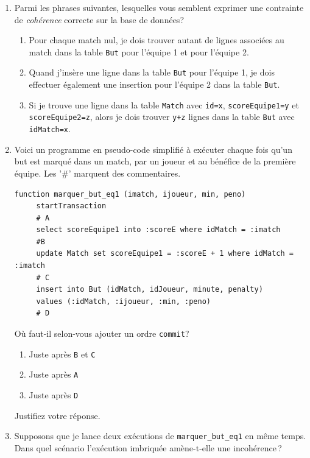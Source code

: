 \begin{enumerate}

\item   Parmi les phrases suivantes, lesquelles vous semblent exprimer une contrainte de \emph{cohérence} correcte sur la base de données?

\begin{enumerate}
  \item Pour chaque match nul, je dois trouver autant de lignes associées au match dans la table \texttt{But} pour l'équipe 1 et pour l'équipe 2.
  \item Quand j'insère une ligne dans la table \texttt{But} pour l'équipe 1, je dois effectuer également une insertion pour l'équipe 2 dans la table \texttt{But}.
  \item Si je trouve une ligne dans la table \texttt{Match} avec \texttt{id=x}, \texttt{scoreEquipe1=y} et \texttt{scoreEquipe2=z}, alors je dois trouver \texttt{y+z} lignes dans la table \texttt{But} avec \texttt{idMatch=x}.
 \end{enumerate}
 
 \item Voici un programme en pseudo-code simplifié à exécuter chaque fois qu'un but est marqué dans un match, par un joueur et au bénéfice de la première équipe. Les '\#' marquent des commentaires.
        
\begin{verbatim}
function marquer_but_eq1 (imatch, ijoueur, min, peno)
     startTransaction
     # A
     select scoreEquipe1 into :scoreE where idMatch = :imatch
     #B
     update Match set scoreEquipe1 = :scoreE + 1 where idMatch = :imatch
     # C
     insert into But (idMatch, idJoueur, minute, penalty)
     values (:idMatch, :ijoueur, :min, :peno)
     # D
\end{verbatim}
 
 Où faut-il selon-vous ajouter un ordre \texttt{commit}?
 \begin{enumerate}
   \item Juste après \texttt{B} et \texttt{C}
   \item Juste après \texttt{A}
   \item Juste après \texttt{D}
 \end{enumerate}
  Justifiez votre réponse.
  
  \item Supposons que je lance deux exécutions de  \texttt{marquer\_but\_eq1} en même temps.
  Dans quel scénario l'exécution imbriquée amène-t-elle une incohérence\,?
\end{enumerate}
